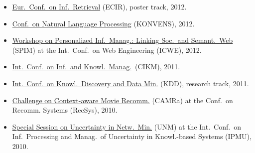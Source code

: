 \documentclass[line,mm]{res}
\newcounter{x}
\newcounter{y}
\begin{document}
\begin{resume}
\begin{itemize}
{  Anal.\ and Tools for Online Community Manag.}\ (MAMA), at
  INFORMATIK, 2013
\item \href{http://ecir2012.upf.edu/}{Eur.\ Conf.\ on Inf.\ Retrieval} (ECIR), poster track, 2012.  
\item \href{http://www.oegai.at/konvens2012/}{Conf.\ on Natural Language
  Processing} (KONVENS), 2012. 
\item \href{http://spim-workshop.org/}{Workshop on Personalized
  Inf.\ Manag.: Linking Soc.\ and Semant.\ Web} (SPIM) at the
  Int.\ Conf.\ on Web Engineering (ICWE), 2012. 
\item \href{http://www.cikm2011.org/}{Int.\ Conf.\ on Inf.\ and Knowl.\ Manag.}\ (CIKM), 2011.
\item \href{http://www.sigkdd.org/kdd/2011/}{Int.\ Conf.\ on 
  Knowl.\ Discovery and Data Min.} (KDD), research track, 2011.
\item \href{http://www.dai-labor.de/camra2010/}{Challenge on
  Context-aware Movie Recomm.} (CAMRa) at the Conf.\ on  
  Recomm. Systems (RecSys), 2010.   
\item \href{http://www.dai-labor.de/unm2010/}{Special Session on Uncertainty in Netw.\ Min.} (UNM) at the
  Int.\ Conf.\ on Inf.\ Processing and Manag.\ of
  Uncertainty in Knowl.-based Systems (IPMU), 2010. 
\end{itemize}


\end{resume}
\end{document}
